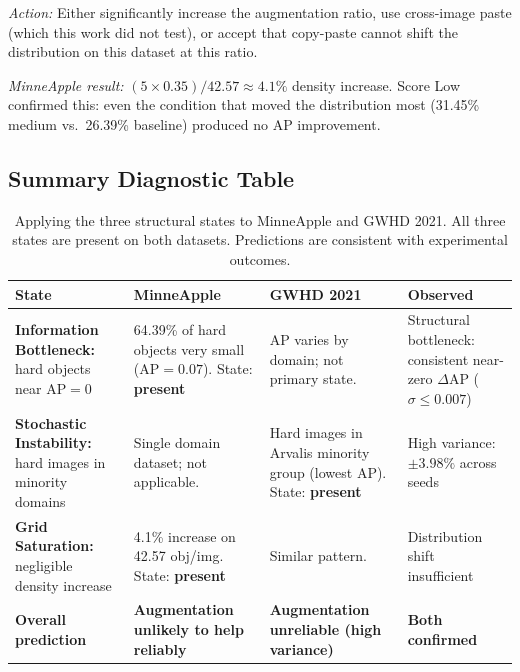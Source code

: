 \documentclass[10pt, a4paper]{article}
\begin{document}
\textit{Action:} Either significantly increase the augmentation ratio,
use cross-image paste (which this work did not test), or accept that
copy-paste cannot shift the distribution on this dataset at this ratio.

\textit{MinneApple result:}
$(5 \times 0.35) / 42.57 \approx 4.1\%$ density increase.
Score Low confirmed this: even the condition that moved the distribution
most (31.45\% medium vs.\ 26.39\% baseline) produced no AP improvement.

\subsection{Summary Diagnostic Table}

\begin{table}[H]
\centering\small
\caption{Applying the three structural states to MinneApple and GWHD 2021.
  All three states are present on both datasets.
  Predictions are consistent with experimental outcomes.}
\begin{tabular}{p{3.8cm}p{4cm}p{4cm}p{4cm}}
\toprule
\textbf{State} & \textbf{MinneApple} & \textbf{GWHD 2021}
  & \textbf{Observed} \\
\midrule
\textbf{Information Bottleneck:}
  hard objects near AP$=0$
  & 64.39\% of hard objects very small (AP$=0.07$).\newline
    State: \textbf{present}
  & AP varies by domain; not primary state.
  & \multirow{1}{=}{Structural bottleneck: consistent near-zero $\Delta$AP ($\sigma\leq0.007$)} \\[6pt]
\textbf{Stochastic Instability:}
  hard images in minority domains
  & Single domain dataset; not applicable.
  & Hard images in Arvalis minority group (lowest AP).\newline
    State: \textbf{present}
  & High variance: $\pm3.98\%$ across seeds \\[6pt]
\textbf{Grid Saturation:}
  negligible density increase
  & 4.1\% increase on 42.57 obj/img.\newline
    State: \textbf{present}
  & Similar pattern.
  & Distribution shift insufficient \\[6pt]
\midrule
\textbf{Overall prediction}
  & \textbf{Augmentation unlikely to help reliably}
  & \textbf{Augmentation unreliable (high variance)}
  & \textbf{Both confirmed} \\
\bottomrule
\end{tabular}
\end{table}
\end{document}
